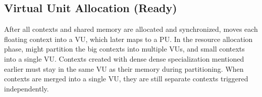 \subsection{Virtual Unit Allocation (Ready)}
After all contexts and shared memory are allocated and synchronized, 
\name moves each floating context into a VU, which later maps to a PU.
In the resource allocation phase, \name might partition the big contexts into multiple VUs, and small contexts into a single VU. 
Contexts created with dense dense specialization mentioned earlier must stay in the same VU as their
memory during partitioning.
When contexts are merged into a single VU, they are still
separate contexts triggered independently.
